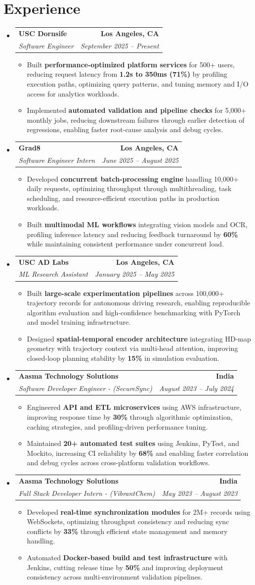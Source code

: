 \documentclass[letterpaper,10pt]{article}
\makeatletter
\newcommand{\resumeItem}[1]{\item\small{{#1 \vspace{-2pt}}}}
\newcommand{\resumeSubheading}[4]{\vspace{-1pt}\item\begin{tabular*}{1.0\textwidth}[t]{l@{\extracolsep{\fill}}r}\textbf{#1} & \textbf{\small #2} \\\textit{\small#3} & \textit{\small #4} \\\end{tabular*}\vspace{-2pt}}
\newcommand{\resumeSubHeadingListStart}{\begin{itemize}[leftmargin=0.0in, label={}]}
\newcommand{\resumeSubHeadingListEnd}{\end{itemize}}
\newcommand{\resumeItemListStart}{\begin{itemize}[leftmargin=0.15in,label=\textbullet,itemsep=2pt,topsep=0pt,parsep=0pt,partopsep=0pt]}
\newcommand{\resumeItemListEnd}{\end{itemize}\vspace{-4pt}}
\makeatother
\begin{document}
\section{Experience}
\resumeSubHeadingListStart
\resumeSubheading{USC Dornsife}{Los Angeles, CA}{Software Engineer}{September 2025 -- Present}
\resumeItemListStart
\resumeItem{Built \textbf{performance-optimized platform services} for 500+ users, reducing request latency from \textbf{1.2s to 350ms (71\%)} by profiling execution paths, optimizing query patterns, and tuning memory and I/O access for analytics workloads.}
\resumeItem{Implemented \textbf{automated validation and pipeline checks} for 5,000+ monthly jobs, reducing downstream failures through earlier detection of regressions, enabling faster root-cause analysis and debug cycles.}
\resumeItemListEnd
\resumeSubheading{Grad8}{Los Angeles, CA}{Software Engineer Intern}{June 2025 -- August 2025}
\resumeItemListStart
\resumeItem{Developed \textbf{concurrent batch-processing engine} handling 10,000+ daily requests, optimizing throughput through multithreading, task scheduling, and resource-efficient execution paths in production workloads.}
\resumeItem{Built \textbf{multimodal ML workflows} integrating vision models and OCR, profiling inference latency and reducing feedback turnaround by \textbf{60\%} while maintaining consistent performance under concurrent load.}
\resumeItemListEnd
\resumeSubheading{USC AD Labs}{Los Angeles, CA}{ML Research Assistant}{January 2025 -- May 2025}
\resumeItemListStart
\resumeItem{Built \textbf{large-scale experimentation pipelines} across 100,000+ trajectory records for autonomous driving research, enabling reproducible algorithm evaluation and high-confidence benchmarking with PyTorch and model training infrastructure.}
\resumeItem{Designed \textbf{spatial-temporal encoder architecture} integrating HD-map geometry with trajectory context via multi-head attention, improving closed-loop planning stability by \textbf{15\%} in simulation evaluation.}
\resumeItemListEnd
\resumeSubheading{Aasma Technology Solutions}{India}{Software Developer Engineer - (SecureSync)}{August 2023 -- July 2024}
\resumeItemListStart
\resumeItem{Engineered \textbf{API and ETL microservices} using AWS infrastructure, improving response time by \textbf{30\%} through algorithmic optimization, caching strategies, and profiling-driven performance tuning.}
\resumeItem{Maintained \textbf{20+ automated test suites} using Jenkins, PyTest, and Mockito, increasing CI reliability by \textbf{68\%} and enabling faster correlation and debug cycles across cross-platform validation workflows.}
\resumeItemListEnd
\resumeSubheading{Aasma Technology Solutions}{India}{Full Stack Developer Intern - (VibrantChem)}{May 2023 -- August 2023}
\resumeItemListStart
\resumeItem{Developed \textbf{real-time synchronization modules} for 2M+ records using WebSockets, optimizing throughput consistency and reducing sync conflicts by \textbf{33\%} through efficient state management and memory handling.}
\resumeItem{Automated \textbf{Docker-based build and test infrastructure} with Jenkins, cutting release time by \textbf{50\%} and improving deployment consistency across multi-environment validation pipelines.}
\resumeItemListEnd
\resumeSubHeadingListEnd
\vspace{-14pt}
\end{document}
